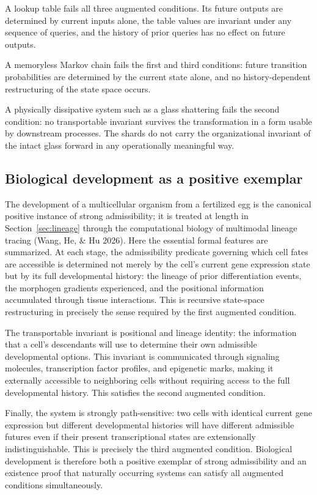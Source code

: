\documentclass[12pt, a4paper]{article}
\theoremstyle{plain}
\theoremstyle{definition}
\theoremstyle{remark}
\begin{document}
A lookup table fails all three augmented conditions. Its future outputs are determined
by current inputs alone, the table values are invariant under any sequence of queries,
and the history of prior queries has no effect on future outputs.

A memoryless Markov chain fails the first and third conditions: future transition
probabilities are determined by the current state alone, and no history-dependent
restructuring of the state space occurs.

A physically dissipative system such as a glass shattering fails the second condition:
no transportable invariant survives the transformation in a form usable by downstream
processes. The shards do not carry the organizational invariant of the intact glass
forward in any operationally meaningful way.

\subsection{Biological development as a positive exemplar}

The development of a multicellular organism from a fertilized egg is the canonical
positive instance of strong admissibility; it is treated at length in
Section~\ref{sec:lineage} through the computational biology of multimodal
lineage tracing (Wang, He, \& Hu 2026). Here the essential formal features
are summarized. At each stage, the admissibility predicate
governing which cell fates are accessible is determined not merely by the cell's current
gene expression state but by its full developmental history: the lineage of prior
differentiation events, the morphogen gradients experienced, and the positional
information accumulated through tissue interactions. This is recursive state-space
restructuring in precisely the sense required by the first augmented condition.

The transportable invariant is positional and lineage identity: the information that a
cell's descendants will use to determine their own admissible developmental options.
This invariant is communicated through signaling molecules, transcription factor profiles,
and epigenetic marks, making it externally accessible to neighboring cells without
requiring access to the full developmental history. This satisfies the second augmented
condition.

Finally, the system is strongly path-sensitive: two cells with identical current gene
expression but different developmental histories will have different admissible futures
even if their present transcriptional states are extensionally indistinguishable.
This is precisely the third augmented condition. Biological development is therefore
both a positive exemplar of strong admissibility and an existence proof that naturally
occurring systems can satisfy all augmented conditions simultaneously.
\end{document}
